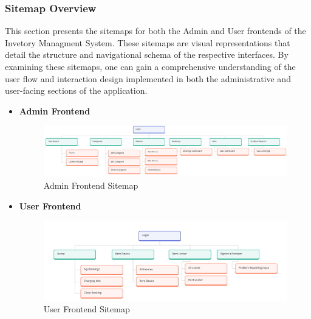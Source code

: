 \subsubsection{Sitemap Overview}
This section presents the sitemaps for both the Admin and User frontends of the Invetory Managment System. These sitemaps are visual representations that detail the structure and navigational schema of the respective interfaces. By examining these sitemaps, one can gain a comprehensive understanding of the user flow and interaction design implemented in both the administrative and user-facing sections of the application.
\begin{itemize}
\item \textbf {Admin Frontend}
\begin{figure}[h]
    \centering
    \includegraphics[width=1\textwidth]{images/Sitemap.jpg}
    \caption{Admin Frontend Sitemap}
    \label{fig:myimage}
\end{figure}
\clearpage
\item \textbf {User Frontend}
\begin{figure}[h]
    \centering
    \includegraphics[width=1\textwidth]{images/usersitemap.jpg}
    \caption{User Frontend Sitemap}
    \label{fig:myimage}
\end{figure}
\end{itemize}

